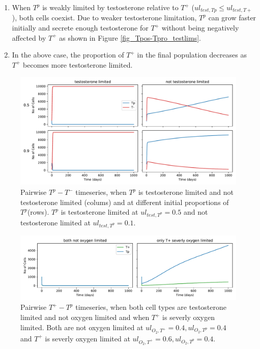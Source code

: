 \documentclass[a4paper]{article}
\begin{document}
\begin{itemize}
\begin{enumerate}
    \item When $T^p$ is weakly limited by testosterone relative to $T^+$ ($ul_{test,Tp} \leq ul_{test,T+}$), both cells coexist. Due to weaker testosterone limitation, $T^p$ can grow faster initially and secrete enough testosterone for $T^+$ without being negatively affected by $T^+$ as shown in Figure \ref{fig_Tpos-Tpro_testlims}.
    \item In the above case, the proportion of $T^+$ in the final population decreases as $T^+$ becomes more testosterone limited.
  \end{enumerate}
\end{itemize}
\begin{figure}[h]
  \centering
  \includegraphics[width=\textwidth]{Tpro-Tneg}
  \caption{Pairwise $T^p - T^-$ timeseries, when $T^p$ is testosterone limited and not testosterone limited (colums) and at different initial proportions of $T^p$(rows). $T^p$ is testosterone limited at $ul_{test,T^p}=0.5$ and not testosterone limited at $ul_{test,T^p}=0.1$.}
  \label{fig_Tpro-Tneg}
\end{figure}
\begin{figure}[h!]
  \centering
  \includegraphics[width=\textwidth]{Tpos-Tpro_o2lims}
  \caption{Pairwise $T^+ - T^p$ timeseries, when both cell types are testosterone limited and not oxygen limited and when $T^+$ is severly oxygen limited. Both are not oxygen limited at $ul_{O_2,T^+}=0.4,ul_{O_2,T^p}=0.4$ and $T^+$ is severly oxygen limited at $ul_{O_2,T^+}=0.6,ul_{O_2,T^p}=0.4$.}
  \label{fig_Tpos-Tpro_o2lims}
\end{figure}
\end{document}
